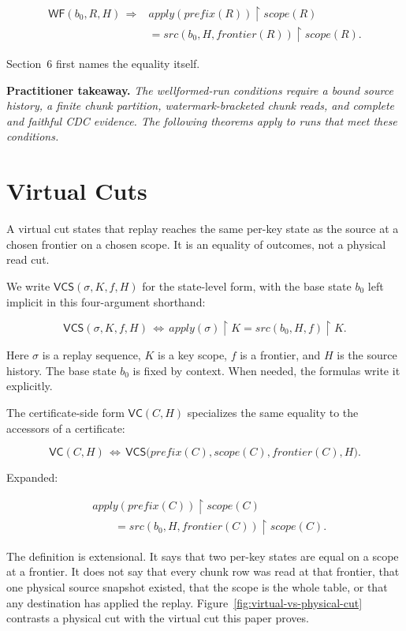 \documentclass[letterpaper,10pt,twocolumn]{article}
\newcommand{\restrict}{\mathbin{\upharpoonright}}
\newcommand{\Apply}{\mathit{apply}}
\newcommand{\Src}{\mathit{src}}
\newcommand{\Scope}{\mathit{scope}}
\newcommand{\Frontier}{\mathit{frontier}}
\newcommand{\CleanPrefix}{\mathit{prefix}}
\newcommand{\WF}{\mathsf{WF}}
\newcommand{\VC}{\mathsf{VC}}
\newcommand{\VCS}{\mathsf{VCS}}
\begin{document}
\[
\begin{aligned}
  \WF(b_0,R,H) \,\Longrightarrow{}&
    \Apply(\CleanPrefix(R)) \restrict \Scope(R)\\
  &{}= \Src(b_0,H,\Frontier(R)) \restrict \Scope(R).
\end{aligned}
\]

Section~6 first names the equality itself.

\smallskip
\noindent\textbf{Practitioner takeaway.} \emph{The wellformed-run
conditions require a bound source history, a finite chunk partition,
watermark-bracketed chunk reads, and complete and faithful CDC evidence.
The following theorems apply to runs that meet these conditions.}

\section{Virtual Cuts}\label{virtual-cuts}

\enlargethispage{2\baselineskip}

A virtual cut states that replay reaches the same per-key state as the
source at a chosen frontier on a chosen scope. It is an equality of
outcomes, not a physical read cut.

We write $\VCS(\sigma,K,f,H)$ for the state-level form, with the base
state $b_0$ left implicit in this four-argument shorthand:

\[
  \VCS(\sigma,K,f,H) \,\Longleftrightarrow\,
    \Apply(\sigma) \restrict K = \Src(b_0,H,f) \restrict K.
\]

Here $\sigma$ is a replay sequence, $K$ is a key scope,
$f$ is a frontier, and $H$ is the source history. The base
state $b_0$ is fixed by context. When needed, the formulas
write it explicitly.

The certificate-side form $\VC(C,H)$ specializes the same equality to
the accessors of a certificate:

\[
\VC(C,H) \,\Longleftrightarrow\,
  \VCS\bigl(\CleanPrefix(C),\Scope(C),\Frontier(C),H\bigr).
\]

Expanded:

\[
\begin{aligned}
&\Apply(\CleanPrefix(C)) \restrict \Scope(C)\\
&\qquad= \Src(b_0,H,\Frontier(C)) \restrict \Scope(C).
\end{aligned}
\]

The definition is extensional. It says that two per-key
states are equal on a scope at a frontier. It does not say that every
chunk row was read at that frontier, that one physical source snapshot
existed, that the scope is the whole table, or that any destination has
applied the replay.
Figure~\ref{fig:virtual-vs-physical-cut} contrasts a physical cut with
the virtual cut this paper proves.
\end{document}

